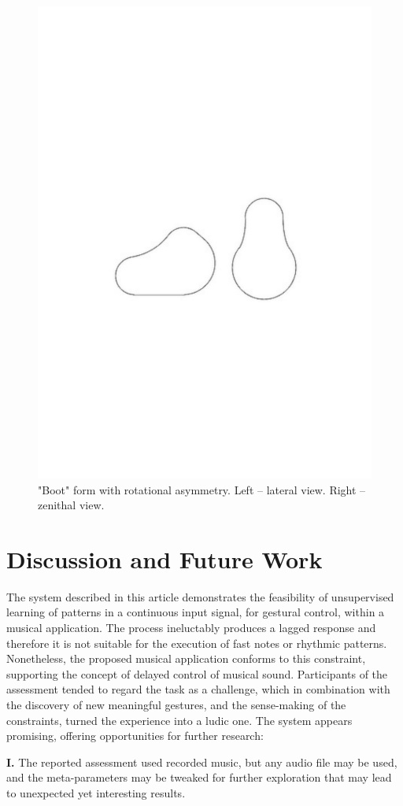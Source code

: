 \documentclass{nime-alternate_ADJ} %
\begin{document}
\begin{figure}[t!]
	\centering
		\includegraphics[trim={4cm 11.2cm 4cm 12cm}, clip=true, width=0.5\columnwidth]{boot_shape}
	\caption{"Boot" form with rotational asymmetry. Left -- lateral view. Right -- zenithal view.}
	\label{fig_8}
\end{figure}

\vspace{0.5cm}

\section{Discussion and Future Work}

The system described in this article demonstrates the feasibility of unsupervised learning of patterns in a continuous input signal, for gestural control, within a musical application. The process ineluctably produces a lagged response and therefore it is not suitable for the execution of fast notes or rhythmic patterns. Nonetheless, the proposed musical application conforms to this constraint, supporting the concept of delayed control of musical sound. Participants of the assessment tended to regard the task as a challenge, which in combination with the discovery of new meaningful gestures, and the sense-making of the constraints, turned the experience into a ludic one. The system appears promising, offering opportunities for further research:

\textbf{I.} The reported assessment used recorded music, but any audio file may be used, and the meta-parameters may be tweaked for further exploration that may lead to unexpected yet interesting results.
\end{document}
